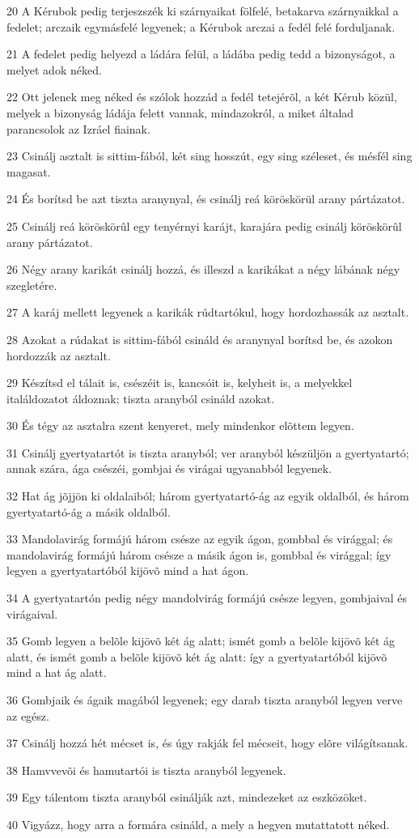\par 20 A Kérubok pedig terjeszszék ki szárnyaikat fölfelé, betakarva szárnyaikkal a fedelet; arczaik egymásfelé legyenek; a Kérubok arczai a fedél felé forduljanak.
\par 21 A fedelet pedig helyezd a ládára felül, a ládába pedig tedd a bizonyságot, a melyet adok néked.
\par 22 Ott jelenek meg néked és szólok hozzád a fedél tetejérõl, a két Kérub közül, melyek a bizonyság ládája felett vannak, mindazokról, a miket általad parancsolok az Izráel fiainak.
\par 23 Csinálj asztalt is sittim-fából, két sing hosszút, egy sing széleset, és mésfél sing magasat.
\par 24 És borítsd be azt tiszta aranynyal, és csinálj reá köröskörül arany pártázatot.
\par 25 Csinálj reá köröskörûl egy tenyérnyi karájt, karajára pedig csinálj köröskörûl arany pártázatot.
\par 26 Négy arany karikát csinálj hozzá, és illeszd a karikákat a négy lábának négy szegletére.
\par 27 A karáj mellett legyenek a karikák rúdtartókul, hogy hordozhassák az asztalt.
\par 28 Azokat a rúdakat is sittim-fából csináld és aranynyal borítsd be, és azokon hordozzák az asztalt.
\par 29 Készítsd el tálait is, csészéit is, kancsóit is, kelyheit is, a melyekkel italáldozatot áldoznak; tiszta aranyból csináld azokat.
\par 30 És tégy az asztalra szent kenyeret, mely mindenkor elõttem legyen.
\par 31 Csinálj gyertyatartót is tiszta aranyból; ver aranyból készüljön a gyertyatartó; annak szára, ága csészéi, gombjai és virágai ugyanabból legyenek.
\par 32 Hat ág jõjjön ki oldalaiból; három gyertyatartó-ág az egyik oldalból, és három gyertyatartó-ág a másik oldalból.
\par 33 Mandolavirág formájú három csésze az egyik ágon, gombbal és virággal; és mandolavirág formájú három csésze a másik ágon is, gombbal és virággal; így legyen a gyertyatartóból kijövõ mind a hat ágon.
\par 34 A gyertyatartón pedig négy mandolvirág formájú csésze legyen, gombjaival és virágaival.
\par 35 Gomb legyen a belõle kijövõ két ág alatt; ismét gomb a belõle kijövõ két ág alatt, és ismét gomb a belõle kijövõ két ág alatt: így a gyertyatartóból kijövõ mind a hat ág alatt.
\par 36 Gombjaik és ágaik magából legyenek; egy darab tiszta aranyból legyen verve az egész.
\par 37 Csinálj hozzá hét mécset is, és úgy rakják fel mécseit, hogy elõre világítsanak.
\par 38 Hamvvevõi és hamutartói is tiszta aranyból legyenek.
\par 39 Egy tálentom tiszta aranyból csinálják azt, mindezeket az eszközöket.
\par 40 Vigyázz, hogy arra a formára csináld, a mely a hegyen mutattatott néked.

